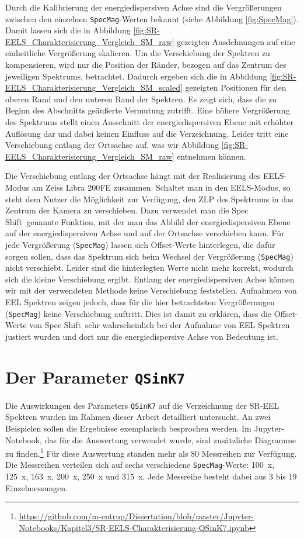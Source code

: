 \documentclass[
	paper=a4,				%
	twoside=true,			%
	BCOR=6mm,				%
	fontsize=12pt,			%
	pagesize=auto,			%
	numbers=noenddot,		%
	bibliography=totoc,		%
	draft=false
]{scrartcl}
\begin{document}
Durch die Kalibrierung der energiedispersiven Achse sind die Vergrößerungen zwischen den einzelnen \texttt{SpecMag}-Werten bekannt (siehe Abbildung \ref{fig:SpecMag}). Damit lassen sich die in Abbildung \ref{fig:SR-EELS_Charakterisierung_Vergleich_SM_raw} gezeigten Ausdehnungen auf eine einheitliche Vergrößerung skalieren. Um die Verschiebung der Spektren zu kompensieren, wird nur die Position der Ränder, bezogen auf das Zentrum des jeweiligen Spektrums, betrachtet. Dadurch ergeben sich die in Abbildung \ref{fig:SR-EELS_Charakterisierung_Vergleich_SM_scaled} gezeigten Positionen für den oberen Rand und den unteren Rand der Spektren. Es zeigt sich, dass die zu Beginn des Abschnitts geäußerte Vermutung zutrifft. Eine höhere Vergrößerung des Spektrums stellt einen Ausschnitt der energiedispersiven Ebene mit erhöhter Auflösung dar und dabei keinen Einfluss auf die Verzeichnung. Leider tritt eine Verschiebung entlang der Ortsachse auf, was wir Abbildung \ref{fig:SR-EELS_Charakterisierung_Vergleich_SM_raw} entnehmen können.

Die Verschiebung entlang der Ortsachse hängt mit der Realisierung des EELS-Modus am Zeiss Libra 200FE zusammen. Schaltet man in den EELS-Modus, so steht dem Nutzer die Möglichkeit zur Verfügung, den ZLP des Spektrums in das Zentrum der Kamera zu verschieben. Dazu verwendet man die \glqq Spec Shift\grqq\ genannte Funktion, mit der man das Abbild der energiedispersiven Ebene auf der energiedispersiven Achse und auf der Ortsachse verschieben kann. Für jede Vergrößerung (\texttt{SpecMag}) lassen sich Offset-Werte hinterlegen, die dafür sorgen sollen, dass das Spektrum sich beim Wechsel der Vergrößerung (\texttt{SpecMag}) nicht verschiebt. Leider sind die hinterlegten Werte nicht mehr korrekt, wodurch sich die kleine Verschiebung ergibt. Entlang der energiedispersiven Achse können wir mit der verwendeten Methode keine Verschiebung feststellen. Aufnahmen von EEL Spektren zeigen jedoch, dass für die hier betrachteten Vergrößerungen (\texttt{SpecMag}) keine Verschiebung auftritt. Dies ist damit zu erklären, dass die Offset-Werte von \glqq Spec Shift\grqq\ sehr wahrscheinlich bei der Aufnahme von EEL Spektren justiert wurden und dort nur die energiedispersive Achse von Bedeutung ist.

\section{Der Parameter \texttt{QSinK7}} \label{append:Characterisierung-QSinK7}

Die Auswirkungen des Parameters \texttt{QSinK7} auf die Verzeichnung der SR-EEL Spektren wurden im Rahmen dieser Arbeit detailliert untersucht. An zwei Beispielen sollen die Ergebnisse exemplarisch besprochen werden. Im Jupyter-Notebook, das für die Auswertung verwendet wurde, sind zusätzliche Diagramme zu finden.\footnote{\url{https://github.com/m-entrup/Dissertation/blob/master/Jupyter-Notebooks/Kapitel3/SR-EELS-Charakterisierung-QSinK7.ipynb}}
Für diese Auswertung standen mehr als 80 Messreihen zur Verfügung. Die Messreihen verteilen sich auf sechs verschiedene \texttt{SpecMag}-Werte: \SI{100}{x}, \SI{125}{x}, \SI{163}{x}, \SI{200}{x}, \SI{250}{x} und \SI{315}{x}. Jede Messreihe besteht dabei aus 3 bis 19 Einzelmessungen.
\end{document}
